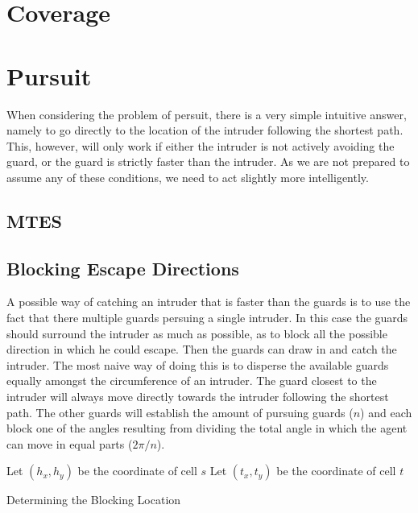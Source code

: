 \documentclass{report}
\begin{document}
	\section{Coverage}

	\section{Pursuit}
		When considering the problem of persuit, there is a very simple intuitive answer, namely to go directly to the location of the intruder following the shortest path. This, however, will only work if either the intruder is not actively avoiding the guard, or the guard is strictly faster than the intruder. As we are not prepared to assume any of these conditions, we need to act slightly more intelligently.

		\subsection{MTES}
			

		\subsection{Blocking Escape Directions}
			A possible way of catching an intruder that is faster than the guards is to use the fact that there multiple guards persuing a single intruder. In this case the guards should surround the intruder as much as possible, as to block all the possible direction in which he could escape. Then the guards can draw in and catch the intruder. The most naive way of doing this is to disperse the available guards equally amongst the circumference of an intruder. The guard closest to the intruder will always move directly towards the intruder following the shortest path. The other guards will establish the amount of pursuing guards ($n$) and each block one of the angles resulting from dividing the total angle in which the agent can move in equal parts ($2\pi / n$).


			\begin{algorithm}[H]
			Let $(h_x,h_y)$ be the coordinate of cell $s$\;
			Let $(t_x,t_y)$ be the coordinate of cell $t$\;
			\label{alg:blockloc}
			\caption{Determining the Blocking Location}
			\end{algorithm}
\end{document}
